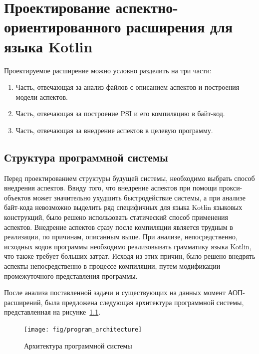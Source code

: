 \chapter{Проектирование аспектно-ориентированного расширения для языка Kotlin}
\label{cha:extension_design}
Проектируемое расширение можно условно разделить на три части:
\begin{enumerate}
	\item Часть, отвечающая за анализ файлов с описанием аспектов и построения
		модели аспектов.
	\item Часть, отвечающая за построение PSI и его компиляцию в байт-код.
	\item Часть, отвечающая за внедрение аспектов в целевую программу.
\end{enumerate}
\section{Структура программной системы}
\label{sec:prototype_structure}
Перед проектированием структуры будущей системы, необходимо выбрать способ
внедрения аспектов.
Ввиду того, что внедрение аспектов при помощи прокси-объектов может значительно
ухудшить быстродействие системы, а при анализе байт-кода невозможно выделить
ряд специфичных для языка Kotlin языковых конструкций, было решено использовать
статический способ применения аспектов.
Внедрение аспектов сразу после компиляции является трудным в реализации, по
причинам, описанным выше.
При анализе, непосредственно, исходных кодов программы необходимо реализовывать
грамматику языка Kotlin, что также требует больших затрат.
Исходя из этих причин, было решено внедрять аспекты непосредственно в процессе
компиляции, путем модификации промежуточного представления программы.

После анализа поставленной задачи и существующих на данных момент
АОП-расширений, была предложена следующая архитектура программной системы,
представленная на рисунке~\ref{fig:program_architecture}.

\begin{figure}[htbp]
\centering
\texttt{[image: fig/program\_architecture]}
\caption{Архитектура программной системы}%
\label{fig:program_architecture}
\end{figure}

